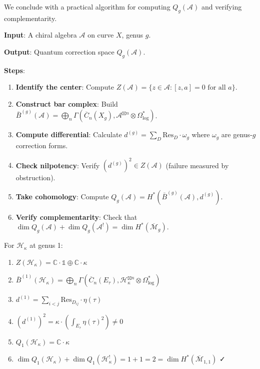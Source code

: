 We conclude with a practical algorithm for computing $Q_g(\mathcal{A})$ and verifying 
complementarity.

\begin{algorithm}
\label{alg:quantum-corrections}

\textbf{Input}: A chiral algebra $\mathcal{A}$ on curve $X$, genus $g$.

\textbf{Output}: Quantum correction space $Q_g(\mathcal{A})$.

\textbf{Steps}:
\begin{enumerate}
\item \textbf{Identify the center}: Compute $Z(\mathcal{A}) = \{z \in \mathcal{A} : 
[z, a] = 0 \text{ for all } a\}$.

\item \textbf{Construct bar complex}: Build $\bar{B}^{(g)}(\mathcal{A}) = \bigoplus_n 
\Gamma(\overline{C}_n(X_g), \mathcal{A}^{\boxtimes n} \otimes \Omega^*_{\log})$.

\item \textbf{Compute differential}: Calculate $d^{(g)} = \sum_{D} \text{Res}_D \cdot 
\omega_g$ where $\omega_g$ are genus-$g$ correction forms.

\item \textbf{Check nilpotency}: Verify $(d^{(g)})^2 \in Z(\mathcal{A})$ (failure 
measured by obstruction).

\item \textbf{Take cohomology}: Compute $Q_g(\mathcal{A}) = H^*(\bar{B}^{(g)}(\mathcal{A}), 
d^{(g)})$.

\item \textbf{Verify complementarity}: Check that $\dim Q_g(\mathcal{A}) + \dim Q_g(
\mathcal{A}^!) = \dim H^*(\overline{\mathcal{M}}_g)$.
\end{enumerate}
\end{algorithm}

\begin{example}
For $\mathcal{H}_\kappa$ at genus 1:
\begin{enumerate}
\item $Z(\mathcal{H}_\kappa) = \mathbb{C} \cdot \mathbb{1} \oplus \mathbb{C} \cdot 
\kappa$
\item $\bar{B}^{(1)}(\mathcal{H}_\kappa) = \bigoplus_n \Gamma(\overline{C}_n(E_\tau), 
\mathcal{H}_\kappa^{\boxtimes n} \otimes \Omega^*_{\log})$
\item $d^{(1)} = \sum_{i<j} \text{Res}_{D_{ij}} \cdot \eta(\tau)$
\item $(d^{(1)})^2 = \kappa \cdot (\int_{E_\tau} \eta(\tau)^2) \neq 0$
\item $Q_1(\mathcal{H}_\kappa) = \mathbb{C} \cdot \kappa$
\item $\dim Q_1(\mathcal{H}_\kappa) + \dim Q_1(\mathcal{H}_\kappa^!) = 1 + 1 = 2 = 
\dim H^*(\overline{\mathcal{M}}_{1,1})$ ✓
\end{enumerate}
\end{example}

